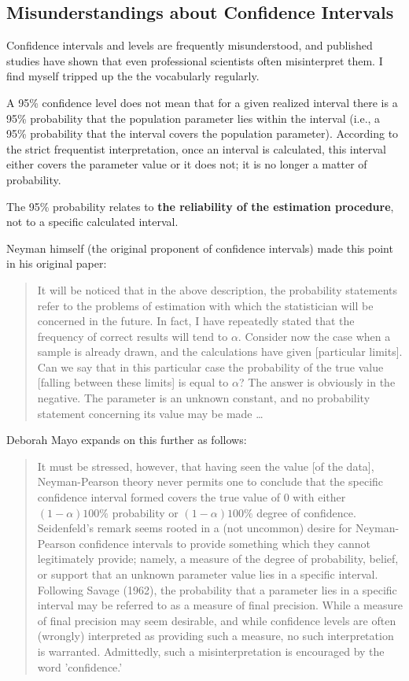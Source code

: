 \documentclass{tufte-handout}\usepackage[]{graphicx}\usepackage[]{color}
\begin{document}
\subsection{Misunderstandings about Confidence Intervals}

Confidence intervals and levels are frequently misunderstood, and published studies have shown that even professional scientists often misinterpret them. I find myself tripped up the the vocabularly regularly. 

A 95\% confidence level does not mean that for a given realized interval there is a 95\% probability that the population parameter lies within the interval (i.e., a 95\% probability that the interval covers the population parameter). According to the strict frequentist interpretation, once an interval is calculated, this interval either covers the parameter value or it does not; it is no longer a matter of probability. 

The 95\% probability relates to \textbf{the reliability of the estimation procedure}, not to a specific calculated interval.

Neyman himself (the original proponent of confidence intervals) made this point in his original paper:

\begin{quote}
It will be noticed that in the above description, the probability statements refer to the problems of estimation with which the statistician will be concerned in the future. In fact, I have repeatedly stated that the frequency of correct results will tend to $\alpha$. Consider now the case when a sample is already drawn, and the calculations have given [particular limits]. Can we say that in this particular case the probability of the true value [falling between these limits] is equal to $\alpha$? The answer is obviously in the negative. The parameter is an unknown constant, and no probability statement concerning its value may be made \ldots
\end{quote}

\noindent Deborah Mayo expands on this further as follows:

\begin{quote}
It must be stressed, however, that having seen the value [of the data], Neyman-Pearson theory never permits one to conclude that the specific confidence interval formed covers the true value of 0 with either $(1 - \alpha)100\%$ probability or $(1 - \alpha)100\%$ degree of confidence. Seidenfeld's remark seems rooted in a (not uncommon) desire for Neyman-Pearson confidence intervals to provide something which they cannot legitimately provide; namely, a measure of the degree of probability, belief, or support that an unknown parameter value lies in a specific interval. Following Savage (1962), the probability that a parameter lies in a specific interval may be referred to as a measure of final precision. While a measure of final precision may seem desirable, and while confidence levels are often (wrongly) interpreted as providing such a measure, no such interpretation is warranted. Admittedly, such a misinterpretation is encouraged by the word 'confidence.'
\end{quote}
\end{document}
